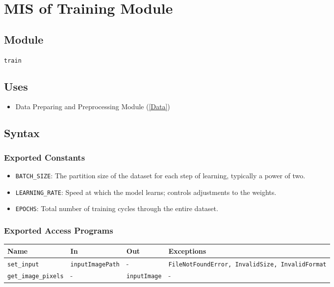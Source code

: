 \documentclass[12pt, titlepage]{article}
\def\code#1{\texttt{#1}}
\begin{document}
\section{MIS of Training Module} \label{Train} 

\subsection{Module}
\code{train} 

\subsection{Uses}
\begin{itemize}
  \item Data Preparing and Preprocessing Module (\ref{Data})
\end{itemize}


\subsection{Syntax}
\subsubsection{Exported Constants}
\begin{itemize}
  \item \code{BATCH\_SIZE}: The partition size of the dataset for each step of learning, 
  typically a power of two.
  \item \code{LEARNING\_RATE}: Speed at which the model learns; controls adjustments to the weights.
  \item \code{EPOCHS}: Total number of training cycles through the entire dataset.
\end{itemize}

\subsubsection{Exported Access Programs}

\begin{center}
\begin{tabular}{p{3.5cm} p{4cm} p{4cm} p{4cm}}
\hline
\textbf{Name} & \textbf{In} & \textbf{Out} & \textbf{Exceptions} \\
\hline
\code{set\_input} & \code{inputImagePath} & - & \code{FileNotFoundError, InvalidSize, InvalidFormat} \\
\code{get\_image\_pixels} & - & \code{inputImage} & - \\
\hline
\end{tabular}
\end{center}
\end{document}
